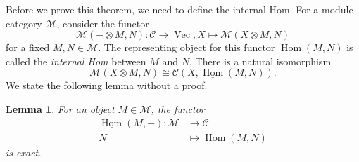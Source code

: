 \documentclass[a4paper, 10pt]{book}
\newtheorem{Lem}[theorem]{Lemma}
\theoremstyle{definition}
\numberwithin{equation}{chapter}
\newcommand\ot{\otimes}
\newcommand\Vect{\operatorname{Vec}}
\newcommand\Hom{\operatorname{Hom}}
\newcommand\M{\mathcal{M}}
\newcommand\C{\mathcal C}
\newcommand{\ra}\rightarrow
\begin{document}
Before we prove this theorem, we need to define the internal Hom. 
For a module category $\M$, consider the functor \begin{equation}
	\M(-\otimes M, N): \C\rightarrow \Vect, X\mapsto \M(X\otimes M, N) 
\end{equation} for a fixed $M, N\in \M$. The representing object for this functor $\underline{\Hom}(M, N)$ is called the \textit{internal Hom} between $M$ and $N$. There is a natural isomorphism \begin{equation}
	\M(X\otimes M, N) \cong \C(X, \underline{\Hom}(M, N)).\label{internalhomiso}
\end{equation}
We state the following lemma without a proof. 
\begin{Lem}\label{internalhomexact}
 For an object $M\in \M$, the functor \begin{align}
 \underline{\Hom} (M, -) :  \M &\rightarrow \C\\
	 N &\mapsto \underline{\Hom}(M, N)
\end{align} is exact.
 \end{Lem} 

\end{document}

